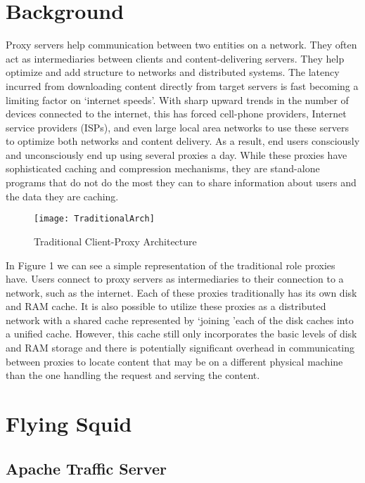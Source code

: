 

\section{Background}

Proxy servers help communication between two entities on a network. They often act as intermediaries between clients and content-delivering servers. They help optimize and add structure to networks and distributed systems. The latency incurred from downloading content directly from target servers is fast becoming a limiting factor on ‘internet speeds’. With sharp upward trends in the number of devices connected to the internet, this has forced cell-phone providers, Internet service providers (ISPs), and even large local area networks to use these servers to optimize both networks and content delivery. As a result, end users consciously and unconsciously end up using several proxies a day. While these proxies have sophisticated caching and compression mechanisms, they are stand-alone programs that do not do the most they can to share information about users and the data they are caching.

\begin{figure}[H] \centering
\texttt{[image: TraditionalArch]}
\caption{Traditional Client-Proxy Architecture}
\end{figure}


In Figure 1 we can see a simple representation of the traditional role proxies have. Users connect to proxy servers as intermediaries to their connection to a network, such as the internet. Each of these proxies traditionally has its own disk and RAM cache. It is also possible to utilize these proxies as a distributed network with a shared cache represented by \lq joining \rq each of the disk caches into a unified cache. However, this cache still only incorporates the basic levels of disk and RAM storage and there is potentially significant overhead in communicating between proxies to locate content that may be on a different physical machine than the one handling the request and serving the content.





\section{Flying Squid}

\subsection{Apache Traffic Server}

